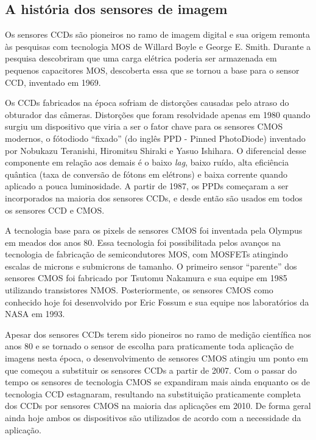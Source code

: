 \documentclass[10pt,a4paper,twocolumn]{article}
\begin{document}
	\subsection*{A história dos sensores de imagem}
		Os sensores CCDs são pioneiros no ramo de imagem digital e sua origem remonta às pesquisas com tecnologia MOS de Willard Boyle e George E. Smith. Durante a pesquisa descobriram que uma carga elétrica poderia ser armazenada em pequenos capacitores MOS, descoberta essa que se tornou a base para o sensor CCD, inventado em 1969.
		
		Os CCDs fabricados na época sofriam de distorções causadas pelo atraso do obturador das câmeras. Distorções que foram resolvidade apenas em 1980 quando surgiu um dispositivo que viria a ser o fator chave para os sensores CMOS modernos, o fótodiodo ``fixado'' (do inglês PPD - Pinned PhotoDiode) inventado por Nobukazu Teranishi, Hiromitsu Shiraki e Yasuo Ishihara. O diferencial desse componente em relação aos demais é o baixo \textit{lag}, baixo ruído, alta eficiência quântica (taxa de conversão de fótons em elétrons) e baixa corrente quando aplicado a pouca luminosidade. A partir de 1987, os PPDs começaram a ser incorporados na maioria dos sensores CCDs, e desde então são usados em todos os sensores CCD e CMOS.
		
		A tecnologia base para os pixels de sensores CMOS foi inventada pela Olympus em meados dos anos 80. Essa tecnologia foi possibilitada pelos avanços na tecnologia de fabricação de semicondutores MOS, com MOSFETs atingindo escalas de microns e submicrons de tamanho. O primeiro sensor ``parente'' dos sensores CMOS foi fabricado por Tsutomu Nakamura e sua equipe em 1985 utilizando transistores NMOS. Posteriormente, os sensores CMOS como conhecido hoje foi desenvolvido por Eric Fossum e sua equipe nos laboratórios da NASA em 1993.
	
		Apesar dos sensores CCDs terem sido pioneiros no ramo de medição científica nos anos 80 e se tornado o sensor de escolha para praticamente toda aplicação de imagens nesta época, o desenvolvimento de sensores CMOS atingiu um ponto em que começou a substituir os sensores CCDs a partir de 2007. Com o passar do tempo os sensores de tecnologia CMOS se expandiram mais ainda enquanto os de tecnologia CCD estagnaram, resultando na substituição praticamente completa dos CCDs por sensores CMOS na maioria das aplicações em 2010. De forma geral ainda hoje ambos os dispositivos são utilizados de acordo com a necessidade da aplicação.
		
\end{document}
